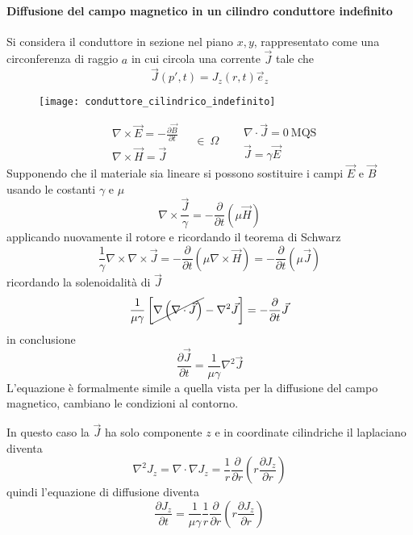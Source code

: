 
\paragraph{Diffusione del campo magnetico in un cilindro conduttore indefinito}
Si considera il conduttore in sezione nel piano $x,y$, rappresentato come una circonferenza di raggio $a$
in cui circola una corrente $\vec{J}$ tale che
$$
\vec{J}(p',t) = J_z(r,t)\vec{e}_z
$$
\begin{figure}[H]
\centering
\texttt{[image: conduttore\_cilindrico\_indefinito]}
\end{figure}

$$
\begin{aligned}
&\nabla\times\vec{E} = -\frac{\partial\vec{B}}{\partial t} \\
&\nabla\times\vec{H} = \vec{J}
\end{aligned}\quad \in\ \Omega \quad
\begin{aligned}
&\nabla\cdot\vec{J}=0\ \text{MQS}\\
&\vec{J} = \gamma\vec{E}
\end{aligned}
$$
Supponendo che il materiale sia lineare si possono sostituire i campi $\vec{E}$ e $\vec{B}$ usando le costanti
$\gamma$ e $\mu$
$$
\nabla\times\frac{\vec{J}}{\gamma} = -\frac{\partial}{\partial t} \left(\mu\vec{H}\right)
$$
applicando nuovamente il rotore e ricordando il teorema di Schwarz
$$
\frac{1}{\gamma}\nabla\times\nabla\times\vec{J} = -\frac{\partial}{\partial t} \left(\mu\nabla\times\vec{H}\right)
= - \frac{\partial}{\partial t} \left(\mu\vec{J}\right)
$$
ricordando la solenoidalità di $\vec{J}$
$$
\frac{1}{\mu\gamma} \left[\cancel{\nabla\left(\nabla\cdot\vec{J}\right)} - \nabla^2\vec{J}\right] = -\frac{\partial}{\partial t} \vec{J}
$$
in conclusione
$$
\frac{\partial \vec{J}}{\partial t} = \frac{1}{\mu\gamma}\nabla^2\vec{J}
$$
L'equazione è formalmente simile a quella vista per la diffusione del campo magnetico, cambiano le condizioni
al contorno.

In questo caso la $\vec{J}$ ha solo componente $z$ e in coordinate cilindriche il laplaciano diventa
$$
\nabla^2J_z = \nabla\cdot\nabla J_z = \frac{1}{r}\frac{\partial}{\partial r} \left(r \frac{\partial J_z}{\partial r}\right)
$$
quindi l'equazione di diffusione diventa
$$
\frac{\partial J_z}{\partial t} = \frac{1}{\mu\gamma} \frac{1}{r} \frac{\partial}{\partial r}\left(r \frac{\partial J_z}{\partial r}\right)
$$

